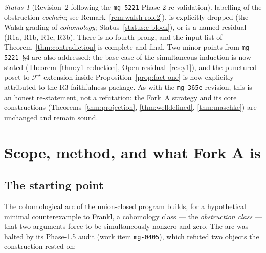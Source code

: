 \documentclass[11pt,oneside]{amsart}
\theoremstyle{plain}
\theoremstyle{definition}
\theoremstyle{remark}
\theoremstyle{honeststyle}
\newtheorem{status}[theorem]{Status}
\newcommand{\F}{\mathcal{F}}
\newcommand{\Fstar}{\F^{\star}}
\begin{document}
\begin{status}[Revision~2 following the \texttt{mg-5221} Phase-2
re-validation]
labelling of the obstruction \emph{cochain}; see
Remark~\ref{rem:walsh-role2}), is explicitly dropped (the Walsh
grading of \emph{cohomology}; Status~\ref{status:c-block}), or is a
named residual (R1a, R1b, R1c, R3b). There is no fourth prong, and
the input list of Theorem~\ref{thm:contradiction} is complete and
final. Two minor points from \texttt{mg-5221}~\S4 are also addressed:
the base case of the simultaneous induction is now stated
(Theorem~\ref{thm:y1-reduction}, Open residual~\ref{res:y1}), and the
punctured-poset-to-$\Fstar$ extension inside
Proposition~\ref{prop:fact-one} is now explicitly attributed to the
R3 faithfulness package. As with the \texttt{mg-365e} revision, this
is an honest re-statement, not a refutation: the Fork~A strategy and
its core constructions (Theorems~\ref{thm:projection},
\ref{thm:welldefined}, \ref{thm:maschke}) are unchanged and remain
sound.
\end{status}

\section{Scope, method, and what Fork A is}
\label{sec:scope}

\subsection{The starting point}
\label{ssec:starting-point}

The cohomological arc of the union-closed program builds, for a
hypothetical minimal counterexample to Frankl, a cohomology class --- the
\emph{obstruction class} --- that two arguments force to be
simultaneously nonzero and zero. The arc was halted by its Phase-1.5
audit (work item \texttt{mg-0405}), which refuted two objects the
construction rested on:
\end{document}
